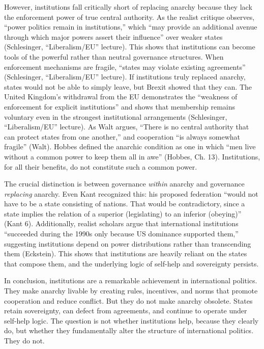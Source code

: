 \documentclass[12pt]{article}
\begin{document}
However, institutions fall critically short of replacing anarchy because they lack the enforcement power of true central authority. As the realist critique observes, ``power politics remain in institutions,'' which ``may provide an additional avenue through which major powers assert their influence'' over weaker states (Schlesinger, ``Liberalism/EU'' lecture). This shows that institutions can become tools of the powerful rather than neutral governance structures. When enforcement mechanisms are fragile, ``states may violate existing agreements'' (Schlesinger, ``Liberalism/EU'' lecture). If institutions truly replaced anarchy, states would not be able to simply leave, but Brexit showed that they can. The United Kingdom's withdrawal from the EU demonstrates the ``weakness of enforcement for explicit institutions'' and shows that membership remains voluntary even in the strongest institutional arrangements (Schlesinger, ``Liberalism/EU'' lecture). As Walt argues, ``There is no central authority that can protect states from one another,'' and cooperation ``is always somewhat fragile'' (Walt). Hobbes defined the anarchic condition as one in which ``men live without a common power to keep them all in awe'' (Hobbes, Ch. 13). Institutions, for all their benefits, do not constitute such a common power.

The crucial distinction is between governance \textit{within} anarchy and governance \textit{replacing} anarchy. Even Kant recognized this: his proposed federation ``would not have to be a state consisting of nations. That would be contradictory, since a state implies the relation of a superior (legislating) to an inferior (obeying)'' (Kant 6). Additionally, realist scholars argue that international institutions ``succeeded during the 1990s only because US dominance supported them,'' suggesting institutions depend on power distributions rather than transcending them (Eckstein). This shows that institutions are heavily reliant on the states that compose them, and the underlying logic of self-help and sovereignty persists.

In conclusion, institutions are a remarkable achievement in international politics. They make anarchy livable by creating rules, incentives, and norms that promote cooperation and reduce conflict. But they do not make anarchy obsolete. States retain sovereignty, can defect from agreements, and continue to operate under self-help logic. The question is not whether institutions help, because they clearly do, but whether they fundamentally alter the structure of international politics. They do not.
\end{document}
